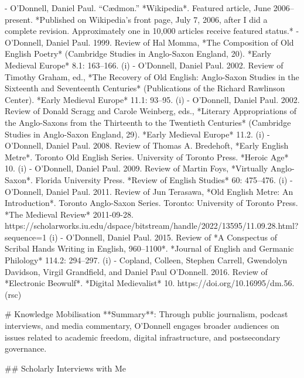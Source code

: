 - O'Donnell, Daniel Paul. “Cædmon.” *Wikipedia*. Featured article, June 2006–present. 
    *Published on Wikipedia’s front page, July 7, 2006, after I did a complete revision. Approximately one in 10,000 articles receive featured status.*
- O'Donnell, Daniel Paul. 1999. Review of Hal Momma, *The Composition of Old English Poetry* (Cambridge Studies in Anglo-Saxon England, 20). *Early Medieval Europe* 8.1: 163–166. (i)
- O'Donnell, Daniel Paul. 2002. Review of Timothy Graham, ed., *The Recovery of Old English: Anglo-Saxon Studies in the Sixteenth and Seventeenth Centuries* (Publications of the Richard Rawlinson Center). *Early Medieval Europe* 11.1: 93–95. (i)
- O'Donnell, Daniel Paul. 2002. Review of Donald Scragg and Carole Weinberg, eds., *Literary Appropriations of the Anglo-Saxons from the Thirteenth to the Twentieth Centuries* (Cambridge Studies in Anglo-Saxon England, 29). *Early Medieval Europe* 11.2. (i)
- O'Donnell, Daniel Paul. 2008. Review of Thomas A. Bredehoft, *Early English Metre*. Toronto Old English Series. University of Toronto Press. *Heroic Age* 10. (i)
- O'Donnell, Daniel Paul. 2009. Review of Martin Foys, *Virtually Anglo-Saxon*. Florida University Press. *Review of English Studies* 60: 475–476. (i)
- O'Donnell, Daniel Paul. 2011. Review of Jun Terasawa, *Old English Metre: An Introduction*. Toronto Anglo-Saxon Series. Toronto: University of Toronto Press. *The Medieval Review* 2011-09-28. https:/\allowbreak{}/\allowbreak{}scholarworks.iu.edu/\allowbreak{}dspace/\allowbreak{}bitstream/\allowbreak{}handle/\allowbreak{}2022/\allowbreak{}13595/\allowbreak{}11.09.28.html?sequence=1 (i)
- O'Donnell, Daniel Paul. 2015. Review of *A Conspectus of Scribal Hands Writing in English, 960–1100*. *Journal of English and Germanic Philology* 114.2: 294–297. (i)
- Copland, Colleen\*, Stephen Carrell\*, Gwendolyn Davidson\*, Virgil Grandfield\*, and Daniel Paul O'Donnell. 2016. Review of *Electronic Beowulf*. *Digital Medievalist* 10. https:/\allowbreak{}/\allowbreak{}doi.org/\allowbreak{}10.16995/\allowbreak{}dm.56. (rsc)

\sectionbreak{}
# Knowledge Mobilisation
**Summary**: Through public journalism, podcast interviews, and media commentary, O'Donnell engages broader audiences on issues related to academic freedom, digital infrastructure, and postsecondary governance.

\sectionbreak{}
## Scholarly Interviews with Me


